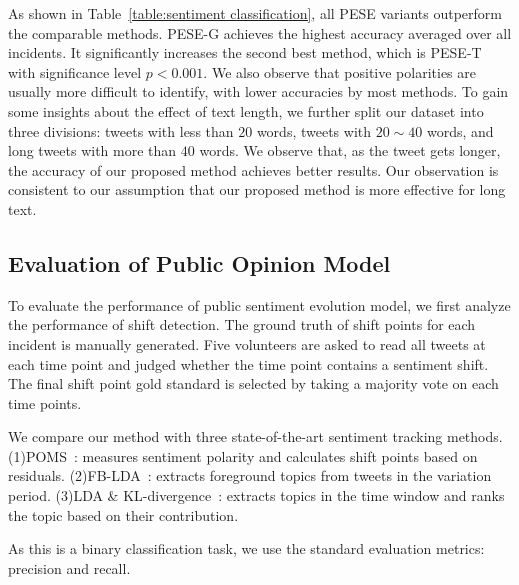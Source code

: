 \documentclass[runningheads]{llncs}
\begin{document}
As shown in Table~\ref{table:sentiment classification}, all PESE variants outperform the comparable methods.
PESE-G achieves the highest accuracy averaged over all incidents. It significantly increases the second best method, which is PESE-T with significance level $p<0.001$.
We also observe that positive polarities are usually more difficult to identify, with lower accuracies by most methods. 
To gain some insights about the effect of text length, we further split our dataset into three divisions: tweets with less than $20$ words, tweets with $20\sim 40$ words, and long tweets with more than $40$ words.
We observe that, as the tweet gets longer, the accuracy of our proposed method achieves better results. Our observation is consistent to our assumption that our proposed method is more effective for long text.



\subsection{Evaluation of Public Opinion Model}
To evaluate the performance of public sentiment evolution model, we first analyze the performance of shift detection. The ground truth of shift points for each incident is manually generated. Five volunteers are asked to read all tweets at each time point and judged whether the time point contains a sentiment shift. The final shift point gold standard is selected by taking a  majority vote on each time points.

We compare our method with three state-of-the-art sentiment tracking methods. (1)POMS~\cite{Bollen2011sentimentchange}: measures sentiment polarity and calculates shift points based on residuals. (2)FB-LDA~\cite{Tan2014topic}:  extracts foreground topics from tweets in the variation period. (3)LDA \& KL-divergence~\cite{Giachanou2016sentichange}: extracts topics in the time window and ranks the topic based on their contribution.

As this is a  binary classification task, we use the standard evaluation metrics:  precision and recall. 
\end{document}
